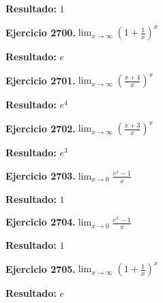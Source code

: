 \documentclass[10pt,a4paper]{article}
\begin{document}
\begin{solbox}
\textbf{Resultado:} \(\displaystyle 1\)
\end{solbox}

\newpage
\begin{ejbox}
\textbf{Ejercicio 2700.}\quad $\lim_{x\to \infty} \left(1+\frac{1}{x}\right)^x$
\end{ejbox}

\begin{solbox}
\textbf{Resultado:} \(\displaystyle e\)
\end{solbox}

\begin{ejbox}
\textbf{Ejercicio 2701.}\quad $\lim_{x\to \infty} \left(\frac{x+4}{x}\right)^{x}$
\end{ejbox}

\begin{solbox}
\textbf{Resultado:} \(\displaystyle e^{4}\)
\end{solbox}

\begin{ejbox}
\textbf{Ejercicio 2702.}\quad $\lim_{x\to \infty} \left(\frac{x+3}{x}\right)^{x}$
\end{ejbox}

\begin{solbox}
\textbf{Resultado:} \(\displaystyle e^{3}\)
\end{solbox}

\newpage
\begin{ejbox}
\textbf{Ejercicio 2703.}\quad $\lim_{x\to 0} \frac{e^x-1}{x}$
\end{ejbox}

\begin{solbox}
\textbf{Resultado:} \(\displaystyle 1\)
\end{solbox}

\begin{ejbox}
\textbf{Ejercicio 2704.}\quad $\lim_{x\to 0} \frac{e^x-1}{x}$
\end{ejbox}

\begin{solbox}
\textbf{Resultado:} \(\displaystyle 1\)
\end{solbox}

\begin{ejbox}
\textbf{Ejercicio 2705.}\quad $\lim_{x\to \infty} \left(1+\frac{1}{x}\right)^x$
\end{ejbox}

\begin{solbox}
\textbf{Resultado:} \(\displaystyle e\)
\end{solbox}
\end{document}
